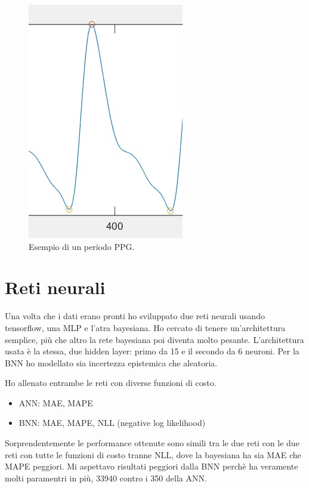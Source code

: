 \documentclass[
	letterpaper,
	a4paper,
	cleardoublepage=empty,
	headings=twolinechapter,
	numbers=autoenddot,
]{article}
\begin{document}
	\begin{figure}[h]
		\centering
		\includegraphics[width=0.7\linewidth]{ImageFiles/ppg_hb}
		\caption{Esempio di un periodo PPG.}
		\label{fig:ppg_hb}
	\end{figure}

	\section{Reti neurali}
	Una volta che i dati erano pronti ho sviluppato due reti neurali usando tensorflow, una MLP e l'atra bayesiana. Ho cercato di tenere un'architettura semplice, più che altro la rete bayesiana poi diventa molto pesante. L'architettura usata è la stessa, due hidden layer: primo da 15 e il secondo da 6 neuroni. Per la BNN ho modellato sia incertezza epistemica che aleatoria.
	
	Ho allenato entrambe le reti con diverse funzioni di costo.
	\begin{itemize}
		\item ANN: MAE, MAPE \\
		\item BNN: MAE, MAPE, NLL (negative log likelihood)
	\end{itemize}

	Sorprendentemente le performance ottenute sono simili tra le due reti con le due reti con tutte le funzioni di costo tranne NLL, dove la bayesiana ha sia MAE che MAPE peggiori. Mi aspettavo risultati peggiori dalla BNN perchè ha veramente molti paramentri in più, 33940 contro i 350 della ANN.
	
\end{document}
